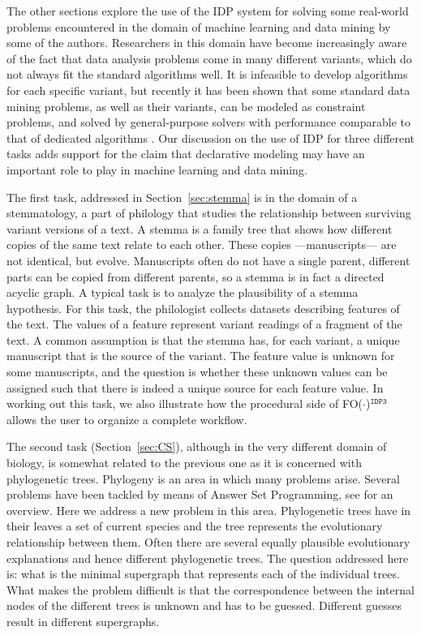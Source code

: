 \documentclass{tlp}
\newcommand{\fodotidp}{{\sc FO($\cdot$)$^{\mathtt{IDP3}}$}\xspace}
\renewcommand{\|}{\ensuremath{\,|\,}}
\renewcommand{\|}{\,|\,}
\begin{document}
The other sections explore the use of the IDP system for solving some
real-world problems encountered in the domain of machine learning and
data mining by some of the authors.  Researchers in this domain have
become increasingly aware of the fact that data analysis problems come
in many different variants, which do not always fit the standard
algorithms well.  It is infeasible to develop algorithms for each
specific variant, but recently it has been shown that some standard
data mining problems, as well as their variants, can be modeled as
constraint problems, and solved by general-purpose solvers with
performance comparable to that of dedicated algorithms
\cite{DBLP:journals/ai/GunsNR11}.  Our discussion on the use of IDP for three
different tasks adds support for the claim that declarative modeling
may have an important role to play in machine learning and data
mining.


The first task, addressed in Section~\ref{sec:stemma} is in the domain
of a stemmatology, a part of philology that studies the relationship
between surviving variant versions of a text. A stemma is a family
tree that shows how different copies of the same text relate to each
other. These copies ---manuscripts--- are not identical, but
evolve. Manuscripts often do not have a single parent, different parts
can be copied from different parents, so a stemma is in fact a
directed acyclic graph. A typical task is to analyze the plausibility
of a stemma hypothesis. For this task, the philologist collects
datasets describing features of the text. The values of a feature
represent variant readings of a fragment of the text. A common
assumption is that the stemma has, for each variant, a unique
manuscript that is the source of the variant. The feature value is
unknown for some manuscripts, and the question is whether these
unknown values can be assigned such that there is indeed a unique
source for each feature value. In working out this task, we also
illustrate how the procedural side of \fodotidp allows the user to
organize a complete workflow.

The second task (Section~\ref{sec:CS}), although in the very different
domain of biology, is somewhat related to the previous one as it is
concerned with phylogenetic trees. Phylogeny is an area in which many
problems arise. Several problems have been tackled by means of Answer
Set Programming, see  for an overview. Here we address a
new problem in this area. Phylogenetic trees have in
their leaves a set of current species and the tree represents the
evolutionary relationship between them. Often there are several
equally plausible evolutionary explanations and hence different
phylogenetic trees. The question addressed here is: what is the
minimal supergraph that represents each of the individual trees. What
makes the problem difficult is that the correspondence between the
internal nodes of the different trees is unknown and has to be
guessed. Different guesses result in different supergraphs. 
\end{document}
